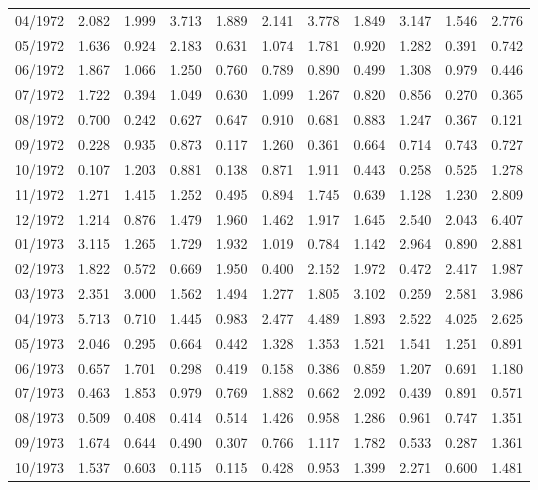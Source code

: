 \begin{tabular}{lrrrrrrrrrr}
04/1972 &  2.082 &  1.999 &  3.713 &  1.889 &  2.141 &  3.778 &  1.849 &  3.147 &  1.546 &  2.776 \\
05/1972 &  1.636 &  0.924 &  2.183 &  0.631 &  1.074 &  1.781 &  0.920 &  1.282 &  0.391 &  0.742 \\
06/1972 &  1.867 &  1.066 &  1.250 &  0.760 &  0.789 &  0.890 &  0.499 &  1.308 &  0.979 &  0.446 \\
07/1972 &  1.722 &  0.394 &  1.049 &  0.630 &  1.099 &  1.267 &  0.820 &  0.856 &  0.270 &  0.365 \\
08/1972 &  0.700 &  0.242 &  0.627 &  0.647 &  0.910 &  0.681 &  0.883 &  1.247 &  0.367 &  0.121 \\
09/1972 &  0.228 &  0.935 &  0.873 &  0.117 &  1.260 &  0.361 &  0.664 &  0.714 &  0.743 &  0.727 \\
10/1972 &  0.107 &  1.203 &  0.881 &  0.138 &  0.871 &  1.911 &  0.443 &  0.258 &  0.525 &  1.278 \\
11/1972 &  1.271 &  1.415 &  1.252 &  0.495 &  0.894 &  1.745 &  0.639 &  1.128 &  1.230 &  2.809 \\
12/1972 &  1.214 &  0.876 &  1.479 &  1.960 &  1.462 &  1.917 &  1.645 &  2.540 &  2.043 &  6.407 \\
01/1973 &  3.115 &  1.265 &  1.729 &  1.932 &  1.019 &  0.784 &  1.142 &  2.964 &  0.890 &  2.881 \\
02/1973 &  1.822 &  0.572 &  0.669 &  1.950 &  0.400 &  2.152 &  1.972 &  0.472 &  2.417 &  1.987 \\
03/1973 &  2.351 &  3.000 &  1.562 &  1.494 &  1.277 &  1.805 &  3.102 &  0.259 &  2.581 &  3.986 \\
04/1973 &  5.713 &  0.710 &  1.445 &  0.983 &  2.477 &  4.489 &  1.893 &  2.522 &  4.025 &  2.625 \\
05/1973 &  2.046 &  0.295 &  0.664 &  0.442 &  1.328 &  1.353 &  1.521 &  1.541 &  1.251 &  0.891 \\
06/1973 &  0.657 &  1.701 &  0.298 &  0.419 &  0.158 &  0.386 &  0.859 &  1.207 &  0.691 &  1.180 \\
07/1973 &  0.463 &  1.853 &  0.979 &  0.769 &  1.882 &  0.662 &  2.092 &  0.439 &  0.891 &  0.571 \\
08/1973 &  0.509 &  0.408 &  0.414 &  0.514 &  1.426 &  0.958 &  1.286 &  0.961 &  0.747 &  1.351 \\
09/1973 &  1.674 &  0.644 &  0.490 &  0.307 &  0.766 &  1.117 &  1.782 &  0.533 &  0.287 &  1.361 \\
10/1973 &  1.537 &  0.603 &  0.115 &  0.115 &  0.428 &  0.953 &  1.399 &  2.271 &  0.600 &  1.481 \\

\end{tabular}
